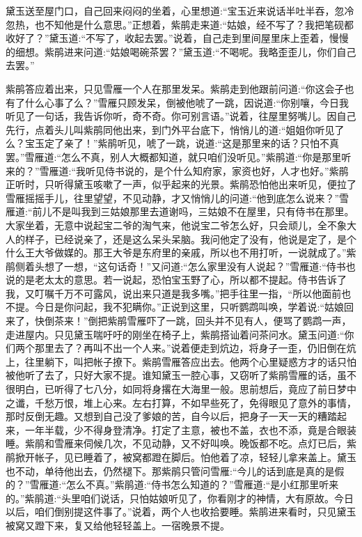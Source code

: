 \begin{parag}
    黛玉送至屋门口，自己回来闷闷的坐着，心里想道:“宝玉近来说话半吐半吞，忽冷忽热，也不知他是什么意思。”正想着，紫鹃走来道:“姑娘，经不写了？我把笔砚都收好了？”黛玉道:“不写了，收起去罢。”说着，自己走到里间屋里床上歪着，慢慢的细想。紫鹃进来问道:“姑娘喝碗茶罢？”黛玉道:“不喝呢。我略歪歪儿，你们自己去罢。”
\end{parag}


\begin{parag}
    紫鹃答应着出来，只见雪雁一个人在那里发呆。紫鹃走到他跟前问道:“你这会子也有了什么心事了么？”雪雁只顾发呆，倒被他唬了一跳，因说道:“你别嚷，今日我听见了一句话，我告诉你听，奇不奇。你可别言语。”说着，往屋里努嘴儿。因自己先行，点着头儿叫紫鹃同他出来，到门外平台底下，悄悄儿的道:“姐姐你听见了么？宝玉定了亲了！”紫鹃听见，唬了一跳，说道:“这是那里来的话？只怕不真罢。”雪雁道:“怎么不真，别人大概都知道，就只咱们没听见。”紫鹃道:“你是那里听来的？”雪雁道:“我听见侍书说的，是个什么知府家，家资也好，人才也好。”紫鹃正听时，只听得黛玉咳嗽了一声，似乎起来的光景。紫鹃恐怕他出来听见，便拉了雪雁摇摇手儿，往里望望，不见动静，才又悄悄儿的问道:“他到底怎么说来？”雪雁道:“前儿不是叫我到三姑娘那里去道谢吗，三姑娘不在屋里，只有侍书在那里。大家坐着，无意中说起宝二爷的淘气来，他说宝二爷怎么好，只会顽儿，全不象大人的样子，已经说亲了，还是这么呆头呆脑。我问他定了没有，他说是定了，是个什么王大爷做媒的。那王大爷是东府里的亲戚，所以也不用打听，一说就成了。”紫鹃侧着头想了一想，“这句话奇！”又问道:“怎么家里没有人说起？”雪雁道:“侍书也说的是老太太的意思。若一说起，恐怕宝玉野了心，所以都不提起。侍书告诉了我，又叮嘱千万不可露风，说出来只道是我多嘴。”把手往里一指，“所以他面前也不提。今日是你问起，我不犯瞒你。”正说到这里，只听鹦鹉叫唤，学着说:“姑娘回来了，快倒茶来！”倒把紫鹃雪雁吓了一跳，回头并不见有人，便骂了鹦鹉一声，走进屋内。只见黛玉喘吁吁的刚坐在椅子上，紫鹃搭讪着问茶问水。黛玉问道:“你们两个那里去了？再叫不出一个人来。”说着便走到炕边，将身子一歪，仍旧倒在炕上，往里躺下，叫把帐子撩下。紫鹃雪雁答应出去。他两个心里疑惑方才的话只怕被他听了去了，只好大家不提。谁知黛玉一腔心事，又窃听了紫鹃雪雁的话，虽不很明白，已听得了七八分，如同将身撂在大海里一般。思前想后，竟应了前日梦中之谶，千愁万恨，堆上心来。左右打算，不如早些死了，免得眼见了意外的事情，那时反倒无趣。又想到自己没了爹娘的苦，自今以后，把身子一天一天的糟踏起来，一年半载，少不得身登清净。打定了主意，被也不盖，衣也不添，竟是合眼装睡。紫鹃和雪雁来伺候几次，不见动静，又不好叫唤。晚饭都不吃。点灯已后，紫鹃掀开帐子，见已睡着了，被窝都蹬在脚后。怕他着了凉，轻轻儿拿来盖上。黛玉也不动，单待他出去，仍然褪下。那紫鹃只管问雪雁:“今儿的话到底是真的是假的？”雪雁道:“怎么不真。”紫鹃道:“侍书怎么知道的？”雪雁道:“是小红那里听来的。”紫鹃道:“头里咱们说话，只怕姑娘听见了，你看刚才的神情，大有原故。今日以后，咱们倒别提这件事了。”说着，两个人也收拾要睡。紫鹃进来看时，只见黛玉被窝又蹬下来，复又给他轻轻盖上。一宿晚景不提。
\end{parag}


